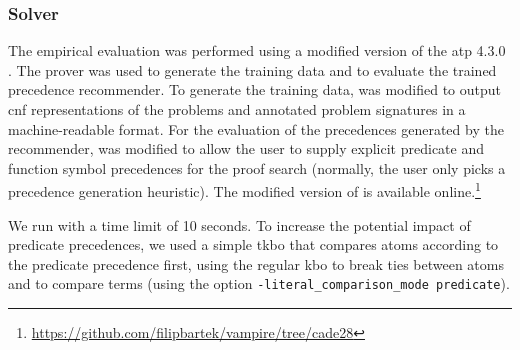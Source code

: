\subsubsection{Solver}

The empirical evaluation was performed using a modified version of the \gls{atp} \Vampire{} 4.3.0 \cite{10.1007/978-3-642-39799-8_1}.
The prover was used to generate the training data and to evaluate the trained precedence recommender.
To generate the training data,
\Vampire{} was modified to output \gls{cnf} representations of the problems
and annotated problem signatures in a machine-readable format.
For the evaluation of the precedences generated by the recommender,
\Vampire{} was modified to allow the user to supply explicit predicate and function symbol precedences for the proof search
(normally, the user only picks a precedence generation heuristic).
The modified version of \Vampire{} is available online.\footnote{\url{https://github.com/filipbartek/vampire/tree/cade28}}

We run \Vampire{} with a time limit of 10 seconds.
To increase the potential impact of predicate precedences,
we used a simple \gls{tkbo} \cite{Ludwig2007,Kovacs2011}
that compares atoms according to the predicate precedence first,
using the regular \gls{kbo} to break ties between atoms
and to compare terms (using the \Vampire{} option \texttt{-literal\_comparison\_mode predicate}).


